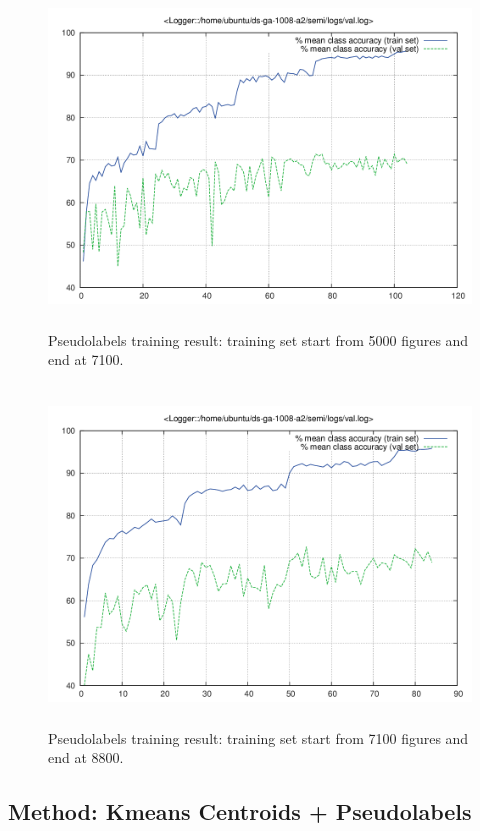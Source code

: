 \documentclass[final]{siamltexmm}
\begin{document}
\begin{figure}[H]
\centering
\includegraphics[width = 140mm, height=90mm]{../fig/pseudo_label/val_7100.png}
  \caption{Pseudo­labels training result: training set start from 5000 figures and end at 7100.}
\end{figure}

\begin{figure}[H]
\centering
\includegraphics[width = 140mm, height=90mm]{../fig/pseudo_label/val_8800.png}
  \caption{Pseudo­labels training result: training set start from 7100 figures and end at 8800.}
\end{figure}

\subsection{Method: K­means Centroids + Pseudo­labels}
\end{document}
